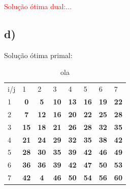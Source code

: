 \documentclass[11pt]{article} %
\begin{document}
\textcolor{red}{Solução ótima dual:...}

\newpage

\subsection*{d)}
Solução ótima primal:

\begin{table}[!htpb]
\centering
\begin{tabular}{lccccccc}
i/j                    & \multicolumn{1}{l}{1}            & \multicolumn{1}{l}{2}            & \multicolumn{1}{l}{3}            & \multicolumn{1}{l}{4}            & \multicolumn{1}{l}{5}            & \multicolumn{1}{l}{6}            & \multicolumn{1}{l}{7}            \\ \cline{2-8} 
\multicolumn{1}{l|}{1} & \multicolumn{1}{c|}{\textbf{0}}  & \multicolumn{1}{c|}{\textbf{5}}  & \multicolumn{1}{c|}{\textbf{10}} & \multicolumn{1}{c|}{\textbf{13}} & \multicolumn{1}{c|}{\textbf{16}} & \multicolumn{1}{c|}{\textbf{19}} & \multicolumn{1}{c|}{\textbf{22}} \\ \cline{2-8} 
\multicolumn{1}{l|}{2} & \multicolumn{1}{c|}{\textbf{7}}  & \multicolumn{1}{c|}{\textbf{12}} & \multicolumn{1}{c|}{\textbf{16}} & \multicolumn{1}{c|}{\textbf{20}} & \multicolumn{1}{c|}{\textbf{22}} & \multicolumn{1}{c|}{\textbf{25}} & \multicolumn{1}{c|}{\textbf{28}} \\ \cline{2-8} 
\multicolumn{1}{l|}{3} & \multicolumn{1}{c|}{\textbf{15}} & \multicolumn{1}{c|}{\textbf{18}} & \multicolumn{1}{c|}{\textbf{21}} & \multicolumn{1}{c|}{\textbf{26}} & \multicolumn{1}{c|}{\textbf{28}} & \multicolumn{1}{c|}{\textbf{32}} & \multicolumn{1}{c|}{\textbf{35}} \\ \cline{2-8} 
\multicolumn{1}{l|}{4} & \multicolumn{1}{c|}{\textbf{21}} & \multicolumn{1}{c|}{\textbf{24}} & \multicolumn{1}{c|}{\textbf{29}} & \multicolumn{1}{c|}{\textbf{32}} & \multicolumn{1}{c|}{\textbf{35}} & \multicolumn{1}{c|}{\textbf{38}} & \multicolumn{1}{c|}{\textbf{42}} \\ \cline{2-8} 
\multicolumn{1}{l|}{5} & \multicolumn{1}{c|}{\textbf{28}} & \multicolumn{1}{c|}{\textbf{30}} & \multicolumn{1}{c|}{\textbf{35}} & \multicolumn{1}{c|}{\textbf{39}} & \multicolumn{1}{c|}{\textbf{42}} & \multicolumn{1}{c|}{\textbf{46}} & \multicolumn{1}{c|}{\textbf{49}} \\ \cline{2-8} 
\multicolumn{1}{l|}{6} & \multicolumn{1}{c|}{\textbf{36}} & \multicolumn{1}{c|}{\textbf{36}} & \multicolumn{1}{c|}{\textbf{39}} & \multicolumn{1}{c|}{\textbf{42}} & \multicolumn{1}{c|}{\textbf{47}} & \multicolumn{1}{c|}{\textbf{50}} & \multicolumn{1}{c|}{\textbf{53}} \\ \cline{2-8} 
\multicolumn{1}{l|}{7} & \multicolumn{1}{c|}{\textbf{42}} & \multicolumn{1}{c|}{\textbf{4}}  & \multicolumn{1}{c|}{\textbf{46}} & \multicolumn{1}{c|}{\textbf{50}} & \multicolumn{1}{c|}{\textbf{54}} & \multicolumn{1}{c|}{\textbf{56}} & \multicolumn{1}{c|}{\textbf{60}} \\ \cline{2-8} 
\end{tabular}
\caption{ola}
\end{table}
\end{document}
